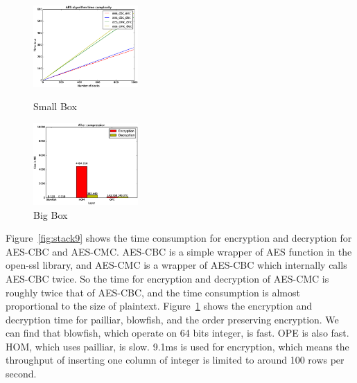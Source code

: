 \begin{figure}   
  \begin{minipage}[t]{0.5\linewidth}  
    \centering   
    \includegraphics[width=4.0cm]{images/aes.eps}   
    \caption{Small Box}   
    \label{fig:stack9}   
  \end{minipage}%
  \begin{minipage}[t]{0.5\linewidth}   
    \centering   
    \includegraphics[width=4.0cm]{images/time.eps}   
    \caption{Big Box}   
    \label{fig:stack10}   
  \end{minipage}   
\end{figure}







Figure~\ref{fig:stack9} shows the time consumption for encryption and decryption for AES-CBC and AES-CMC. AES-CBC is a simple wrapper of AES function in the open-ssl library, and AES-CMC is a wrapper of AES-CBC  which internally calls AES-CBC twice. So the time for encryption and decryption of AES-CMC is roughly twice that of AES-CBC, and the time consumption is almost proportional to the size of plaintext. Figure~\ref{fig:stack10} shows the encryption and decryption time for pailliar, blowfish, and the order preserving encryption. We can find that blowfish, which operate on 64 bits integer, is fast. OPE is also fast. HOM, which uses pailliar, is slow. 9.1ms is used for encryption, which means the throughput of inserting one column of integer is limited to around 100 rows per second.

